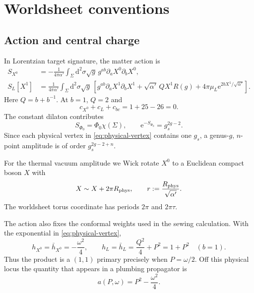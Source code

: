 \documentclass[11pt]{article}
\numberwithin{equation}{section}
\newcommand{\A}{\alpha'}
\newcommand{\dd}{\mathrm d}
\newcommand{\ee}{\mathrm e}
\begin{document}
\section{Worldsheet conventions}

\subsection{Action and central charge}

In Lorentzian target signature, the matter action is
\begin{align}
 S_{X^0}
 &=-\frac{1}{4\pi\A}\int_\Sigma\dd^2\sigma\sqrt g\,
 g^{ab}\partial_aX^0\partial_bX^0,
 \label{eq:timelike-action}\\
 S_L[X^1]
 &=\frac{1}{4\pi\A}\int_\Sigma\dd^2\sigma\sqrt g\,
 \left[
 g^{ab}\partial_aX^1\partial_bX^1
 +\sqrt{\A}\,QX^1R(g)
 +4\pi\mu_L\ee^{2bX^1/\sqrt{\A}}
 \right].
 \label{eq:liouville-action}
\end{align}
Here $Q=b+b^{-1}$.  At $b=1$, $Q=2$ and
\begin{equation}
 c_{X^0}+c_L+c_{bc}=1+25-26=0.
\end{equation}
The constant dilaton contributes
\begin{equation}
 S_{\Phi_0}=\Phi_0\chi(\Sigma),\qquad
 \ee^{-S_{\Phi_0}}=g_s^{2g-2}.
 \label{eq:dilaton-weight}
\end{equation}
Since each physical vertex in \eqref{eq:physical-vertex} contains one $g_s$,
a genus-$g$, $n$-point amplitude is of order $g_s^{2g-2+n}$.

For the thermal vacuum amplitude we Wick rotate $X^0$ to a Euclidean compact
boson $X$ with
\begin{equation}
 X\sim X+2\pi R_{\rm phys},
 \qquad r:=\frac{R_{\rm phys}}{\sqrt{\A}}.
 \label{eq:target-circle}
\end{equation}
The worldsheet torus coordinate has periods $2\pi$ and $2\pi\tau$.

The action also fixes the conformal weights used in the sewing calculation.
With the exponential in \eqref{eq:physical-vertex},
\begin{equation}
 h_{X^0}=\bar h_{X^0}=-\frac{\omega^2}{4},
 \qquad
 h_L=\bar h_L=\frac{Q^2}{4}+P^2=1+P^2
 \quad (b=1).
 \label{eq:weights}
\end{equation}
Thus the product is a $(1,1)$ primary precisely when $P=\omega/2$.  Off this
physical locus the quantity that appears in a plumbing propagator is
\begin{equation}
 a(P,\omega)=P^2-\frac{\omega^2}{4}.
 \label{eq:offshell-a}
\end{equation}
\end{document}
